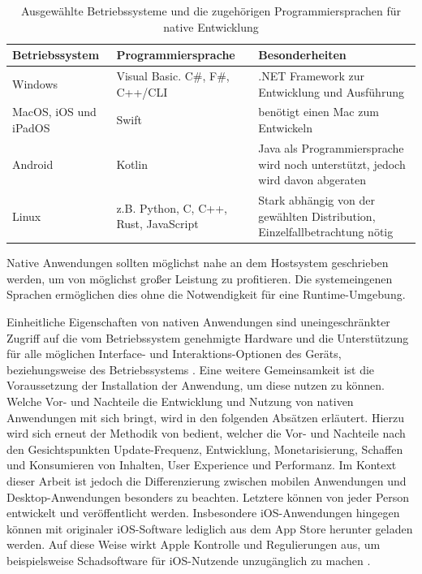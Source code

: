 \documentclass[a4paper]{scrartcl}
\begin{document}
\begin{table}[H]
 	\centering
 	\caption{Ausgewählte Betriebssysteme und die zugehörigen Programmiersprachen für native Entwicklung}
 	\begin{center}
 		\begin{tabularx}{\linewidth}{| Y | Y | Y |}
 			\hline
 			\textbf{Betriebssystem} & \textbf{Programmiersprache} & \textbf{Besonderheiten} \\
 			\hline \hline
 			Windows & Visual Basic. C\#, F\#, C++/CLI & .NET Framework zur Entwicklung und Ausführung \autocite{.NET_Microsoft} \\
 			\hline
 			MacOS, iOS und iPadOS & Swift & benötigt einen Mac zum Entwickeln \autocite{Swift_Apple} \\
 			\hline
 			Android & Kotlin & Java als Programmiersprache wird noch unterstützt, jedoch wird davon abgeraten \autocite{Kotlin_Android} \\
 			\hline
 			Linux & z.B. Python, C, C++, Rust, JavaScript & Stark abhängig von der gewählten Distribution, Einzelfallbetrachtung nötig \autocite{Linux_App} \\
 			\hline
 		\end{tabularx}
 	\end{center}
 	Native Anwendungen sollten möglichst nahe an dem Hostsystem geschrieben werden, um von möglichst großer Leistung zu profitieren. Die systemeingenen Sprachen ermöglichen dies ohne die Notwendigkeit für eine Runtime-Umgebung.
 \end{table}
 
 Einheitliche Eigenschaften von nativen Anwendungen sind uneingeschränkter Zugriff auf die vom Betriebssystem genehmigte Hardware und die Unterstützung für alle möglichen Interface- und Interaktions-Optionen des Geräts, beziehungsweise des Betriebssystems \autocite[28]{Jobe}. Eine weitere Gemeinsamkeit ist die Voraussetzung der Installation der Anwendung, um diese nutzen zu können. \\
 
 Welche Vor- und Nachteile die Entwicklung und Nutzung von nativen Anwendungen mit sich bringt, wird in den folgenden Absätzen erläutert. Hierzu wird sich erneut der Methodik von \textcite[28]{Jobe} bedient, welcher die Vor- und Nachteile nach den Gesichtspunkten Update-Frequenz, Entwicklung, Monetarisierung, Schaffen und Konsumieren von Inhalten, User Experience und Performanz. Im Kontext dieser Arbeit ist jedoch die Differenzierung zwischen mobilen Anwendungen und Desktop-Anwendungen besonders zu beachten. Letztere können von jeder Person entwickelt und veröffentlicht werden. Insbesondere iOS-Anwendungen hingegen können mit originaler iOS-Software lediglich aus dem App Store herunter geladen werden. Auf diese Weise wirkt Apple Kontrolle und Regulierungen aus, um beispielsweise Schadsoftware für iOS-Nutzende unzugänglich zu machen \autocite{Appstore_Guildelines}.
\end{document}
